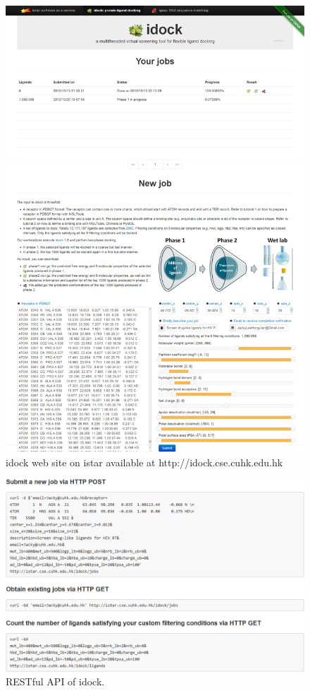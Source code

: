 \begin{figure}
\centering
\includegraphics[width=\linewidth]{istar/idock.png}
\caption{idock web site on istar available at http://idock.cse.cuhk.edu.hk}
\label{istar:idock}
\end{figure}

\begin{figure}
\centering
\includegraphics[width=\linewidth]{istar/idock-rest.png}
\caption{RESTful API of idock.}
\label{istar:idock-rest}
\end{figure}

